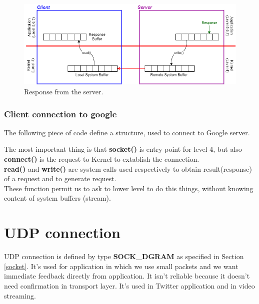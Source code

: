 \begin{figure}[h]
\centering
\includegraphics[scale=0.7]{Images/read_write2}\caption{\footnotesize{Response from the server.}}\label{rw2}
\end{figure}

\clearpage
\subsubsection{Client connection to google}
The following piece of code define a structure, used to connect to Google server. 


The most important thing is that \textbf{socket()} is entry-point for level 4, but also \textbf{connect()} is the request to Kernel to extablish the connection.\\ \textbf{read()} and \textbf{write()} are system calls used respectively to obtain result(response) of a request and to generate request.\\ These function permit us to ask to lower level to do this things, without knowing content of system buffers (stream).

\section{UDP connection}
UDP connection is defined by type \textbf{SOCK\_DGRAM} as specified in Section \ref{socket}. It's used for application in which we use small packets and we want immediate feedback directly from application. It isn't reliable because it doesn't need confirmation in transport layer. It's used in Twitter application and in video streaming.  